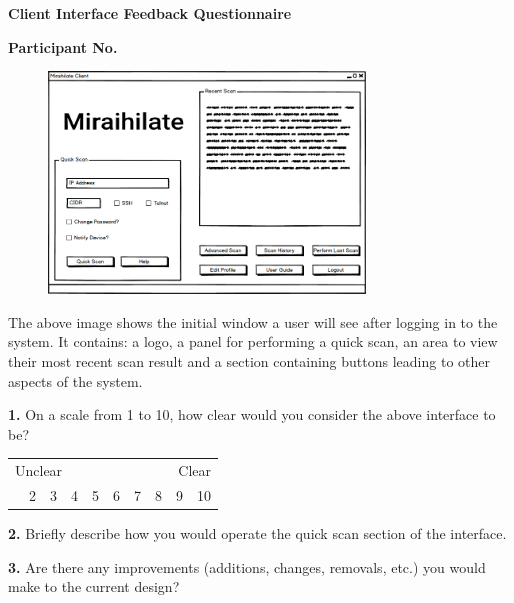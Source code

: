 \begin{center}
	\textbf{Client Interface Feedback Questionnaire}\par
	\textbf{Participant No.}\par
\end{center}

\vspace{0.5cm}

\begin{figure}[h]
\begin{center}
	\includegraphics[width=0.75\textwidth]{img/client_iface_mockup.png}
\end{center}
\end{figure}

\vspace{0.5cm}

The above image shows the initial window a user will see after logging in to the system. It contains: a logo, a panel for performing a quick scan,
an area to view their most recent scan result and a section containing buttons leading to other aspects of the system.

\vspace{0.5cm}

\textbf{1.} On a scale from 1 to 10, how clear would you consider the above interface to be?

\begin{center}
	\begin{table}[h]
	\label{my-label}
	\begin{tabularx}{\textwidth}{XXXXXXXXXX}
	\multicolumn{5}{l}{Unclear} & \multicolumn{5}{r}{Clear} \\
	\centering
	1    & 2    & 3    & 4    & 5    & 6    & 7    & 8    & 9    & 10
	\end{tabularx}
	\end{table}
\end{center}

\textbf{2.} Briefly describe how you would operate the quick scan section of the interface.

\vspace{5cm}

\textbf{3.} Are there any improvements (additions, changes, removals, etc.) you would make to the current design?

\vspace{5cm}
